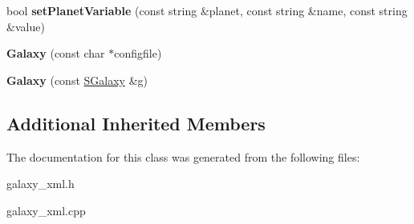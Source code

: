 \begin{DoxyCompactItemize}
\item 
bool {\bfseries set\+Planet\+Variable} (const string \&planet, const string \&name, const string \&value)\hypertarget{classGalaxyXML_1_1Galaxy_a5a0b04c5a2bbb955092c5af119dbc9ca}{}\label{classGalaxyXML_1_1Galaxy_a5a0b04c5a2bbb955092c5af119dbc9ca}

\item 
{\bfseries Galaxy} (const char $\ast$configfile)\hypertarget{classGalaxyXML_1_1Galaxy_a815f2b4f6adc6814a8f120f15876d12b}{}\label{classGalaxyXML_1_1Galaxy_a815f2b4f6adc6814a8f120f15876d12b}

\item 
{\bfseries Galaxy} (const \hyperlink{classGalaxyXML_1_1SGalaxy}{S\+Galaxy} \&g)\hypertarget{classGalaxyXML_1_1Galaxy_a660b4e482730f0326d690cc6d8b48272}{}\label{classGalaxyXML_1_1Galaxy_a660b4e482730f0326d690cc6d8b48272}

\end{DoxyCompactItemize}
\subsection*{Additional Inherited Members}


The documentation for this class was generated from the following files\+:\begin{DoxyCompactItemize}
\item 
galaxy\+\_\+xml.\+h\item 
galaxy\+\_\+xml.\+cpp\end{DoxyCompactItemize}
